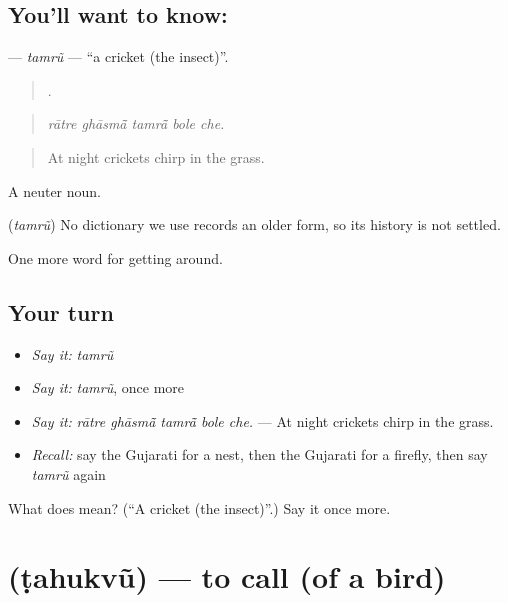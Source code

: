 \subsection*{You'll want to know: }
\textbf{} — \emph{tamrũ} — \textquotedblleft{}a cricket (the insect)\textquotedblright{}.

\begin{quote}
    .
\end{quote}

\begin{quote}
\emph{rātre ghāsmā̃ tamrā̃ bole che.}
\end{quote}

\begin{quote}
At night crickets chirp in the grass.
\end{quote}

A neuter noun.

\begin{cousinweb}
\textbf{} (\emph{tamrũ}) No dictionary we use records an older form, so its history is not settled.
\end{cousinweb}

\begin{grammarlens}[title={What you've built}]
One more word for getting around.
\end{grammarlens}

\subsection*{Your turn}
\begin{itemize}
\raggedright
  \item \emph{Say it:} \emph{tamrũ}
  \item \emph{Say it:} \emph{tamrũ}, once more
  \item \emph{Say it:} \emph{rātre ghāsmā̃ tamrā̃ bole che.} — At night crickets chirp in the grass.
  \item \emph{Recall:} say the Gujarati for a nest, then the Gujarati for a firefly, then say \emph{tamrũ} again
\end{itemize}

\begin{tcolorbox}[breakable,colback=teal!4,colframe=teal!35!black,title={Before you move on}]
What does  mean? (\textquotedblleft{}A cricket (the insect)\textquotedblright{}.) Say it once more.
\end{tcolorbox}
\section[\texorpdfstring{\gu{ટહુકવું} (ṭahukvũ)}{ટહુકવું (ṭahukvũ)}]{ (ṭahukvũ) — to call (of a bird)}

